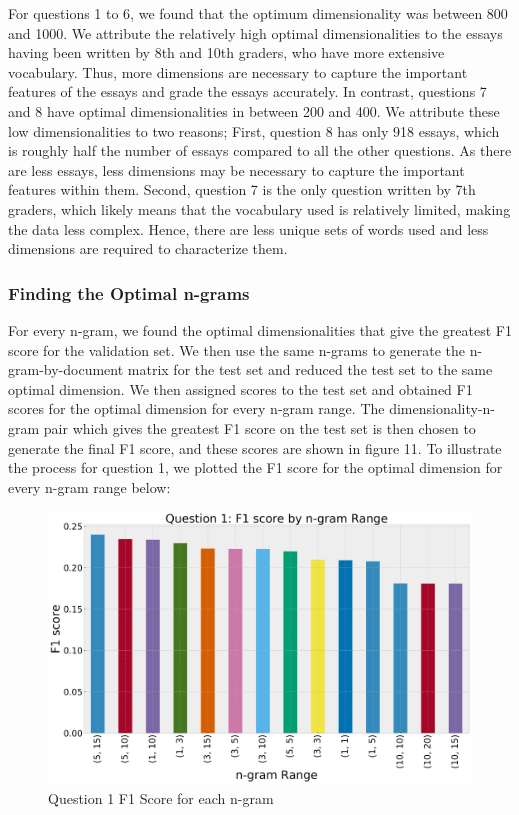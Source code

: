 \documentclass[10pt,letterpaper]{article}
\begin{document}
For questions 1 to 6, we found that the optimum dimensionality was between 800 and 1000. We attribute the relatively high optimal dimensionalities to the essays having been written by 8th and 10th graders, who have more extensive vocabulary. Thus, more dimensions are necessary to capture the important features of the essays and grade the essays accurately. In contrast, questions 7 and 8 have optimal dimensionalities in between 200 and 400. We attribute these low dimensionalities to two reasons; First, question 8 has only 918 essays, which is roughly half the number of essays compared to all the other questions. As there are less essays, less dimensions may be necessary to capture the important features within them. Second, question 7 is the only question written by 7th graders, which likely means that the vocabulary used is relatively limited, making the data less complex. Hence, there are less unique sets of words used and less dimensions are required to characterize them. 
\subsubsection{Finding the Optimal n-grams}For every n-gram, we found the optimal dimensionalities that give the greatest F1 score for the validation set. We then use the same n-grams to generate the n-gram-by-document matrix for the test set and reduced the test set to the same optimal dimension. We then assigned scores to the test set and obtained F1 scores for the optimal dimension for every n-gram range. The dimensionality-n-gram pair which gives the greatest F1 score on the test set is then chosen to generate the final F1 score, and these scores are shown in figure 11.
To illustrate the process for question 1, we plotted the F1 score for the optimal dimension for every n-gram range below:

\begin{figure}[ht]
\begin{center}
\includegraphics[scale = 0.18]{img/Q1F1ByNgrams.png}
\end{center}
\caption{Question 1 F1 Score for each n-gram}
\end{figure}
\end{document}
